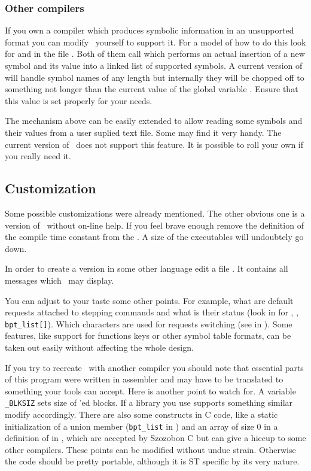 \subsubsection{Other compilers}

If you own a compiler which produces symbolic information in an
unsupported format you can modify \szadb\ yourself to support it.  For
a model of how to do this look for  and
 in the file .  Both of them call
 which performs an actual insertion of a new symbol and
its value into a linked list of supported symbols.  A current version
of  will handle symbol names of any length but internally they
will be chopped off to something not longer than the current value of
the global variable .  Ensure that this value is set properly
for your needs.

The mechanism above can be easily extended to allow reading some
symbols and their values from a user suplied text file.  Some may find
it very handy.  The current version of \szadb\ does not support this
feature.  It is possible to roll your own if you really need it.


\subsection{Customization}

Some possible customizations were already mentioned.
The other obvious one is a version of  \szadb\ without on-line help.
If you feel brave enough remove the definition of 
the compile time constant  from the .
A size of the executables will undoubtely go down.

In order to create a version in some other language edit 
a file .
It contains all messages which \szadb\ may display.

You can adjust to your taste some other points.  For example,
what are default requests attached to stepping
commands and what is their status (look in  for
, , \verb|bpt_list[]|).
Which characters are used for requests switching
(see  in ).
Some features, like support for functions keys or other symbol
table formats, can be taken out easily without affecting the
whole design.

If you try to recreate \szadb\ with another compiler you should note
that essential parts of this program were written in assembler
and may have to be translated to something your tools can accept.
Here is another point to watch for.
A variable \verb|_BLKSIZ| sets size of 'ed blocks.
If a library you use supports something similar modify
accordingly.
There are also some constructs in C code,
like a static initialization of a union member (\verb|bpt_list|
in ) and an array of size 0 in a definition
of  in , which 
are accepted by Szozobon C but can give
a hiccup to some other compilers.
These points can be modified without undue strain.
Otherwise the code should be pretty portable, although it is
ST specific by its very nature.

